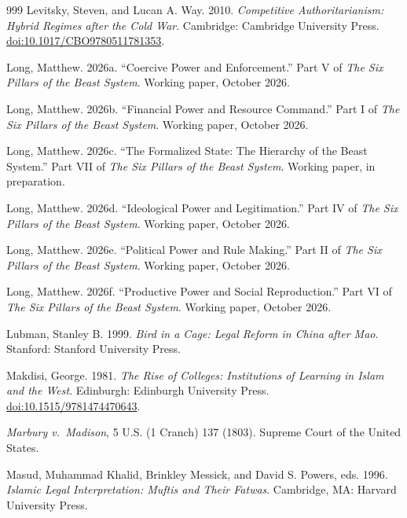 \documentclass[11pt,letterpaper]{article}
\theoremstyle{definition}
\theoremstyle{remark}
\begin{document}
\begin{thebibliography}{999}
Levitsky, Steven, and Lucan A. Way. 2010. \emph{Competitive Authoritarianism: Hybrid Regimes after the Cold War}. Cambridge: Cambridge University Press. \href{https://doi.org/10.1017/CBO9780511781353}{doi:10.1017/CBO9780511781353}.

Long, Matthew. 2026a. ``Coercive Power and Enforcement.'' Part V of \emph{The Six Pillars of the Beast System}. Working paper, October 2026.

Long, Matthew. 2026b. ``Financial Power and Resource Command.'' Part I of \emph{The Six Pillars of the Beast System}. Working paper, October 2026.

Long, Matthew. 2026c. ``The Formalized State: The Hierarchy of the Beast System.'' Part VII of \emph{The Six Pillars of the Beast System}. Working paper, in preparation.

Long, Matthew. 2026d. ``Ideological Power and Legitimation.'' Part IV of \emph{The Six Pillars of the Beast System}. Working paper, October 2026.

Long, Matthew. 2026e. ``Political Power and Rule Making.'' Part II of \emph{The Six Pillars of the Beast System}. Working paper, October 2026.

Long, Matthew. 2026f. ``Productive Power and Social Reproduction.'' Part VI of \emph{The Six Pillars of the Beast System}. Working paper, October 2026.

Lubman, Stanley B. 1999. \emph{Bird in a Cage: Legal Reform in China after Mao}. Stanford: Stanford University Press.

Makdisi, George. 1981. \emph{The Rise of Colleges: Institutions of Learning in Islam and the West}. Edinburgh: Edinburgh University Press. \href{https://doi.org/10.1515/9781474470643}{doi:10.1515/9781474470643}.

\emph{Marbury v.\ Madison}, 5 U.S. (1 Cranch) 137 (1803). Supreme Court of the United States.

Masud, Muhammad Khalid, Brinkley Messick, and David S. Powers, eds. 1996. \emph{Islamic Legal Interpretation: Muftis and Their Fatwas}. Cambridge, MA: Harvard University Press.


\end{thebibliography}
\end{document}
